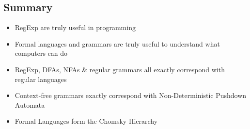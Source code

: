 \subsection{Summary}
\begin{itemize}
    \item RegExp are truly useful in programming
    \item  Formal languages and grammars are truly useful to understand what computers can do
    \item RegExp, DFAs, NFAs & regular grammars all exactly correspond with regular languages
    \item Context-free grammars exactly correspond with Non-Deterministic Pushdown Automata
    \item Formal Languages form the Chomsky Hierarchy
\end{itemize}
